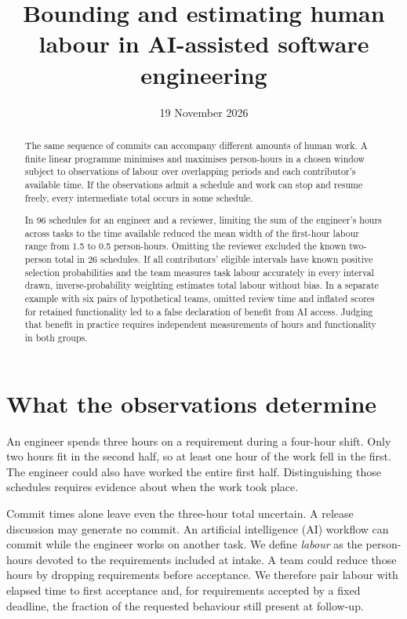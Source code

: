 \documentclass[11pt,a4paper]{amsart}
\title[Human labour in AI-assisted software engineering]{Bounding and estimating human labour in AI-assisted software engineering}
\date{19 November 2026}
\begin{document}
\begin{abstract}
The same sequence of commits can accompany different amounts of human work. A finite linear programme minimises and maximises person-hours in a chosen window subject to observations of labour over overlapping periods and each contributor's available time. If the observations admit a schedule and work can stop and resume freely, every intermediate total occurs in some schedule.

In 96 schedules for an engineer and a reviewer, limiting the sum of the engineer's hours across tasks to the time available reduced the mean width of the first-hour labour range from 1.5 to 0.5 person-hours. Omitting the reviewer excluded the known two-person total in 26 schedules. If all contributors' eligible intervals have known positive selection probabilities and the team measures task labour accurately in every interval drawn, inverse-probability weighting estimates total labour without bias. In a separate example with six pairs of hypothetical teams, omitted review time and inflated scores for retained functionality led to a false declaration of benefit from AI access. Judging that benefit in practice requires independent measurements of hours and functionality in both groups.
\end{abstract}
\maketitle

\section{What the observations determine}
\label{sec:introduction}

An engineer spends three hours on a requirement during a four-hour shift. Only two hours fit in the second half, so at least one hour of the work fell in the first. The engineer could also have worked the entire first half. Distinguishing those schedules requires evidence about when the work took place.

Commit times alone leave even the three-hour total uncertain. A release discussion may generate no commit. An artificial intelligence (AI) workflow can commit while the engineer works on another task. We define \emph{labour} as the person-hours devoted to the requirements included at intake. A team could reduce those hours by dropping requirements before acceptance. We therefore pair labour with elapsed time to first acceptance and, for requirements accepted by a fixed deadline, the fraction of the requested behaviour still present at follow-up.
\end{document}
